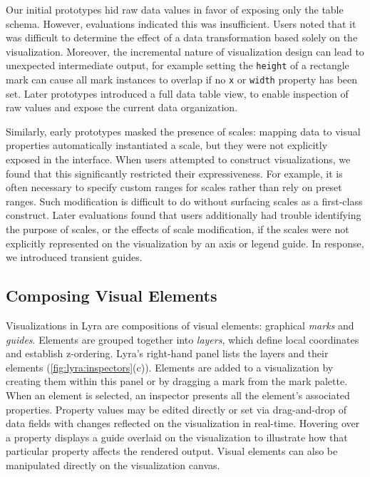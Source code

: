 Our initial prototypes hid raw data values in favor of exposing only the table
schema. However, evaluations indicated this was insufficient. Users noted that
it was difficult to determine the effect of a data transformation based solely
on the visualization. Moreover, the incremental nature of visualization design
can lead to unexpected intermediate output, for example setting the
\texttt{height} of a rectangle mark can cause all mark instances to overlap if
no \texttt{x} or \texttt{width} property has been set. Later prototypes
introduced a full data table view, to enable inspection of raw values and expose
the current data organization.

Similarly, early prototypes masked the presence of scales: mapping data to
visual properties automatically instantiated a scale, but they were not
explicitly exposed in the interface. When users attempted to construct
visualizations, we found that this significantly restricted their
expressiveness. For example, it is often necessary to specify custom ranges
for scales rather than rely on preset ranges. Such modification is difficult
to do without surfacing scales as a first-class construct. Later evaluations
found that users additionally had trouble identifying the purpose of scales,
or the effects of scale modification, if the scales were not explicitly
represented on the visualization by an axis or legend guide. In response, we
introduced transient guides.

\vspace{-10pt}

\subsection{Composing Visual Elements}

\vspace{-7pt}

Visualizations in Lyra are compositions of visual elements: graphical
\emph{marks} and \emph{guides}. Elements are grouped together into
\emph{layers}, which define local coordinates and establish z-ordering. Lyra's
right-hand panel lists the layers and their elements
(\cref{fig:lyra:inspectors}(c)). Elements are added to a visualization by
creating them within this panel or by dragging a mark from the mark palette.
When an element is selected, an inspector presents all the element's associated
properties. Property values may be edited directly or set via drag-and-drop of
data fields with changes reflected on the visualization in real-time. Hovering
over a property displays a guide overlaid on the visualization to illustrate how
that particular property affects the rendered output. Visual elements can also
be manipulated directly on the visualization canvas.

